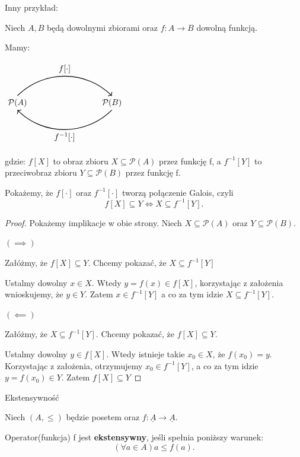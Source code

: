 Inny przykład:

Niech $A,B $ będą dowolnymi zbiorami oraz $f:A \rightarrow B $ dowolną funkcją.

Mamy:

\begin{center}
$
 \begin{tikzpicture}
	 \node (setA) at (-2,0) {$\mathcal{P}(A)$};
	 \node (setB) at (2,0) {$\mathcal{P}(B)$};
 
	 \draw[->, thick] (setA.north) to[out=45, in=135] node[above] {$f[\cdot ]$} (setB.north);
 
	 \draw[<-, thick] (setA.south) to[out=-45, in=-135] node[below] {$f^{-1}[\cdot ]$} (setB.south);
 \end{tikzpicture}$
\end{center}

gdzie: $f[X]$ to obraz zbioru $X \subseteq \mathcal{P}(A)$ przez funkcję f, a  $f^{-1}[Y]$ to przeciwobraz zbioru $Y\subseteq \mathcal{P}(B)$ przez funkcję f.

Pokażemy, że $f[\cdot ]$ oraz $f^{-1}[\cdot ]$ tworzą połączenie Galois, czyli 
\[
	 f[X] \subseteq Y \iff X \subseteq f^{-1}[Y]
.\] 
\begin{proof}

	Pokażemy implikacje w obie strony. Niech $X \subseteq \mathcal{P}(A)$ oraz $Y \subseteq \mathcal{P}(B) $.

	$\left( \implies \right)$ 

	Załóżmy, że $f[X] \subseteq  Y$. Chcemy pokazać, że $X \subseteq f^{-1}[Y]$

	Ustalmy dowolny $x\in X$. Wtedy $y = f(x) \in f[X]$, korzystając z założenia wnioskujemy, że $y \in Y$. Zatem $x \in f^{-1}[Y]$ 
	a co za tym idzie $X \subseteq f^{-1}[Y]$.

	$\left( \impliedby \right) $ 
	
	Załóżmy, że $X \subseteq f^{-1}[Y]$. Chcemy pokazać, że $f[X] \subseteq  Y$.

	Ustalmy dowolny $y \in f[X]$. Wtedy istnieje takie $x_0 \in X$, że $f(x_0) = y$. Korzystając z założenia, otrzymujemy $x_0 \in f^{-1}[Y]$, a co za tym idzie $y = f(x_0) \in Y$. Zatem $f[X]\subseteq Y$ 

\end{proof}

\begin{definition}{Ekstensywność}
	
	Niech $(A, \le)$ będzie posetem oraz $f: \underline{A} \rightarrow \underline{A}$.

	Operator(funkcja) f jest \textbf{ekstensywny}, jeśli spełnia poniższy warunek:
	\[
	\left( \forall a \in A \right) a\le f(a)
	.\] 
\end{definition}

